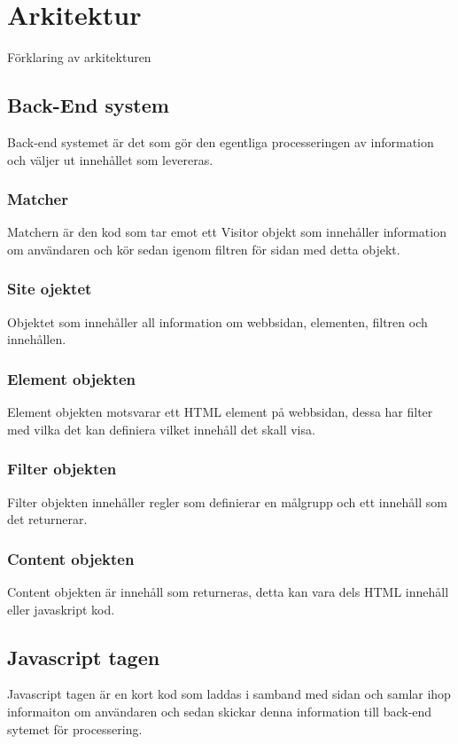 \section{Arkitektur}

Förklaring av arkitekturen

\subsection{Back-End system}

Back-end systemet är det som gör den egentliga processeringen av information och väljer ut innehållet som levereras.

\subsubsection{Matcher}

Matchern är den kod som tar emot ett Visitor objekt som innehåller information om användaren och kör sedan igenom filtren för sidan med detta objekt.

\subsubsection{Site ojektet}

Objektet som innehåller all information om webbsidan, elementen, filtren och innehållen.

\subsubsection{Element objekten}

Element objekten motsvarar ett HTML element på webbsidan, dessa har filter med vilka det kan definiera vilket innehåll det skall visa.

\subsubsection{Filter objekten}

Filter objekten innehåller regler som definierar en målgrupp och ett innehåll som det returnerar.

\subsubsection{Content objekten}

Content objekten är innehåll som returneras, detta kan vara dels HTML innehåll eller javaskript kod.

\subsection{Javascript tagen}

Javascript tagen är en kort kod som laddas i samband med sidan och samlar ihop informaiton om användaren och sedan skickar denna information till back-end sytemet för processering.

